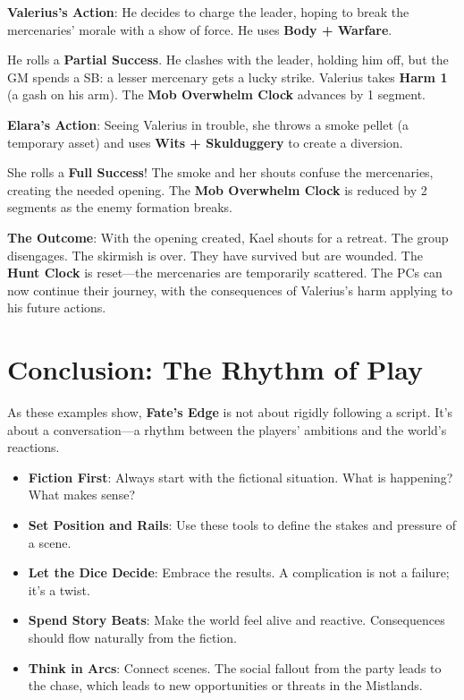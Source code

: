 \textbf{Valerius's Action}: He decides to charge the leader, hoping to break the mercenaries' morale with a show of force. He uses \textbf{Body + Warfare}.

He rolls a \textbf{Partial Success}. He clashes with the leader, holding him off, but the GM spends a SB: a lesser mercenary gets a lucky strike. Valerius takes \textbf{Harm 1} (a gash on his arm). The \textbf{Mob Overwhelm Clock} advances by 1 segment.

\textbf{Elara's Action}: Seeing Valerius in trouble, she throws a smoke pellet (a temporary asset) and uses \textbf{Wits + Skulduggery} to create a diversion.

She rolls a \textbf{Full Success}! The smoke and her shouts confuse the mercenaries, creating the needed opening. The \textbf{Mob Overwhelm Clock} is reduced by 2 segments as the enemy formation breaks.

\textbf{The Outcome}: With the opening created, Kael shouts for a retreat. The group disengages. The skirmish is over. They have survived but are wounded. The \textbf{Hunt Clock} is reset—the mercenaries are temporarily scattered. The PCs can now continue their journey, with the consequences of Valerius's harm applying to his future actions.

\section*{Conclusion: The Rhythm of Play}

As these examples show, \textbf{Fate's Edge} is not about rigidly following a script. It's about a conversation—a rhythm between the players' ambitions and the world's reactions.

\begin{tcolorbox}[title=The GM's Mantra, colback=green!5!white, colframe=green!75!black, fonttitle=\bfseries]
\begin{itemize}
    \item \textbf{Fiction First}: Always start with the fictional situation. What is happening? What makes sense?
    \item \textbf{Set Position and Rails}: Use these tools to define the stakes and pressure of a scene.
    \item \textbf{Let the Dice Decide}: Embrace the results. A complication is not a failure; it's a twist.
    \item \textbf{Spend Story Beats}: Make the world feel alive and reactive. Consequences should flow naturally from the fiction.
    \item \textbf{Think in Arcs}: Connect scenes. The social fallout from the party leads to the chase, which leads to new opportunities or threats in the Mistlands.
\end{itemize}
\end{tcolorbox}

